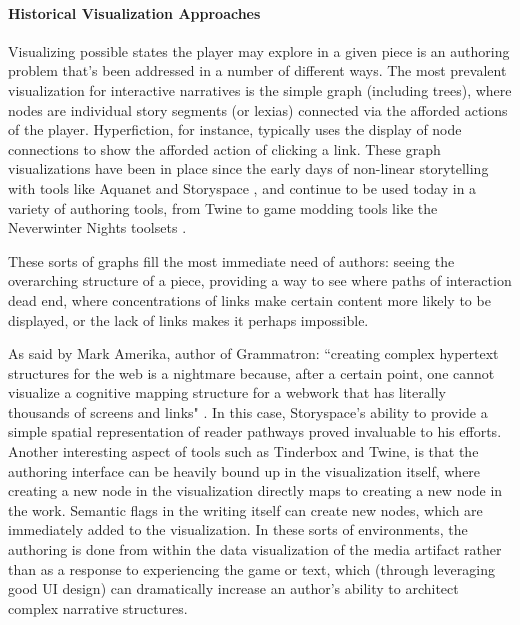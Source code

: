 \paragraph{Historical Visualization Approaches}\label{par:historical-visualization-approaches}

Visualizing possible states the player may explore in a given piece is an authoring problem that’s been addressed in a number of different ways. The most prevalent visualization for interactive narratives is the simple graph (including trees), where nodes are individual story segments (or lexias) connected via the afforded actions of the player. Hyperfiction, for instance, typically uses the display of node connections to show the afforded action of clicking a link. These graph visualizations have been in place since the early days of non-linear storytelling with tools like Aquanet \cite{shipman1999spatial} and Storyspace \cite{bernstein_2007}, and continue to be used today in a variety of authoring tools, from Twine \cite{klimas2008twine} to game modding tools like the Neverwinter Nights toolsets \cite{nwnwiki_2019}. 

These sorts of graphs fill the most immediate need of authors: seeing the overarching structure of a piece, providing a way to see where paths of interaction dead end, where concentrations of links make certain content more likely to be displayed, or the lack of links makes it perhaps impossible.

As said by Mark Amerika, author of Grammatron: ``creating complex hypertext structures for the web is a nightmare because, after a certain point, one cannot visualize a cognitive mapping structure for a webwork that has literally thousands of screens and links" \cite{bernsteinamerika}. In this case, Storyspace’s ability to provide a simple spatial representation of reader pathways proved invaluable to his efforts. Another interesting aspect of tools such as Tinderbox \cite{tinderbox} and Twine, is that the authoring interface can be heavily bound up in the visualization itself, where creating a new node in the visualization directly maps to creating a new node in the work. Semantic flags in the writing itself can create new nodes, which are immediately added to the visualization. In these sorts of environments, the authoring is done from within the data visualization of the media artifact rather than as a response to experiencing the game or text, which (through leveraging good UI design) can dramatically increase an author’s ability to architect complex narrative structures. 

